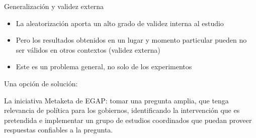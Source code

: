 \documentclass[
  ignorenonframetext,
]{beamer}
\providecommand{\tightlist}{%
  \setlength{\itemsep}{0pt}\setlength{\parskip}{0pt}}
\begin{document}


\begin{frame}{Generalización y validez externa}
\protect\hypertarget{generalizaciuxf3n-y-validez-externa}{}
\begin{itemize}
\tightlist
\item
  La aleatorización aporta un alto grado de validez interna al estudio
\item
  Pero los resultados obtenidos en un lugar y momento particular pueden
  no ser válidos en otros contextos (validez externa)
\item
  Este es un problema general, no solo de los experimentos
\end{itemize}

Una opción de solución:

La iniciativa Metaketa de EGAP: tomar una pregunta amplia, que tenga
relevancia de política para los gobiernos, identificando la intervención
que es pretendida e implementar un grupo de estudios coordinados que
puedan proveer respuestas confiables a la pregunta.
\end{frame}
\end{document}
